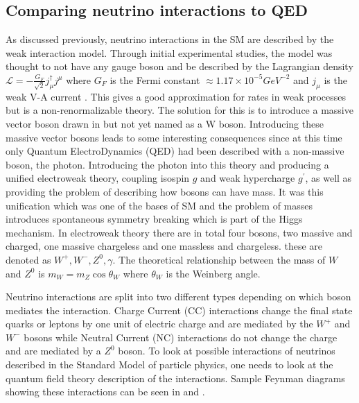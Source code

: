 \subsection{Comparing neutrino interactions to QED}
As discussed previously, neutrino interactions in the SM are described by the weak interaction model. Through initial experimental studies, the model was thought to not have any gauge boson and be described by the Lagrangian density $\mathscr{L} = -\frac{G_F}{\sqrt{2}} j_\mu ^\dagger j^\mu$ where $G_F$ is the Fermi constant $\approx 1.17 \times 10^{-5} GeV^{-2}$ and $j_\mu$ is the weak V-A current \cite{47Soler}. This gives a good approximation for rates in weak processes but is a non-renormalizable theory. The solution for this is to introduce a massive vector boson drawn in  but not yet named as a W boson. Introducing these massive vector bosons leads to some interesting consequences since at this time only Quantum ElectroDynamics (QED) had been described with a non-massive boson, the photon. Introducing the photon into this theory and producing a unified electroweak theory, coupling isospin $g$ and weak hypercharge $g^\prime$, as well as providing the problem of describing how bosons can have mass. It was this unification which was one of the bases of SM and the problem of masses introduces spontaneous symmetry breaking which is part of the Higgs mechanism. In electroweak theory there are in total four bosons, two massive and charged, one massive chargeless and one massless and chargeless. these are denoted as $W^+, W^-, Z^0, \gamma$. The theoretical relationship between the mass of $W$ and $Z^0$ is $m_W = m_Z \cos \theta_W$ where $\theta_W$ is the Weinberg angle.

Neutrino interactions are split into two different types depending on which boson mediates the interaction.
Charge Current (CC) interactions change the final state quarks or leptons by one unit of electric charge and are mediated by the $W^+$ and $W^-$ bosons while Neutral Current (NC) interactions do not change the charge and are mediated by a $Z^0$ boson. 
To look at possible interactions of neutrinos described in the Standard Model of particle physics, one needs to look at the quantum field theory description of the interactions\cite{3Peskin, 2Hallsjo}. Sample Feynman diagrams showing these interactions can be seen in  and .

